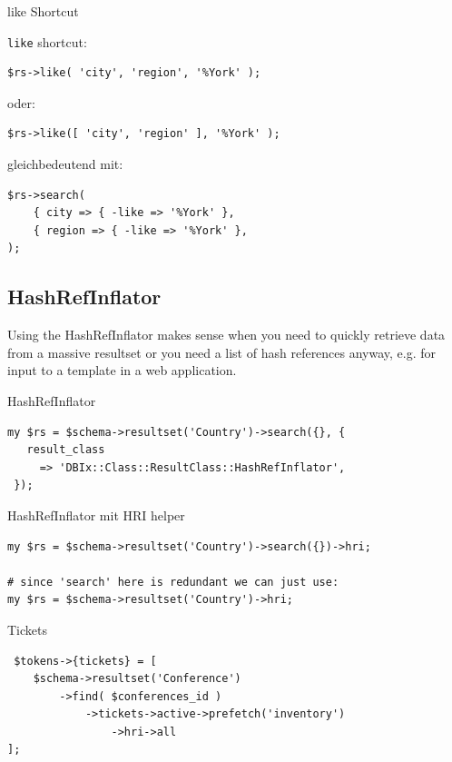 \begin{frame}[fragile]{like Shortcut}

\verb|like| shortcut:

\begin{lstlisting}
$rs->like( 'city', 'region', '%York' );
\end{lstlisting}

oder:

\begin{lstlisting}
$rs->like([ 'city', 'region' ], '%York' );
\end{lstlisting}

gleichbedeutend mit:

\begin{lstlisting}
$rs->search(
    { city => { -like => '%York' },
    { region => { -like => '%York' },
);
\end{lstlisting}
\end{frame}

\subsection{HashRefInflator}

Using the HashRefInflator makes sense when you need to quickly retrieve
data from a massive resultset or you need a list of hash references anyway,
e.g. for input to a template in a web application.

\begin{frame}[fragile]{HashRefInflator}
\begin{lstlisting}
my $rs = $schema->resultset('Country')->search({}, {
   result_class
     => 'DBIx::Class::ResultClass::HashRefInflator',
 });
\end{lstlisting}
\end{frame}

\begin{frame}[fragile]{HashRefInflator mit HRI helper}
\begin{lstlisting}
my $rs = $schema->resultset('Country')->search({})->hri;

# since 'search' here is redundant we can just use:
my $rs = $schema->resultset('Country')->hri;
\end{lstlisting}
\end{frame}

\begin{frame}[fragile]{Tickets}
\begin{lstlisting}
 $tokens->{tickets} = [
    $schema->resultset('Conference')
        ->find( $conferences_id )
            ->tickets->active->prefetch('inventory')
                ->hri->all 
];
\end{lstlisting}
\end{frame}

